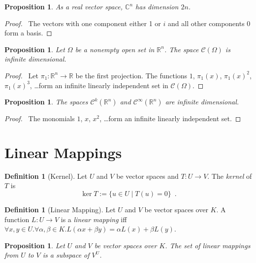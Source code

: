\documentclass{book}
\let\qed\relax
\newtheorem{prop}[ax]{Proposition}
\theoremstyle{definition}
\newtheorem{df}[ax]{Definition}
\begin{document}
\begin{prop}
As a real vector space, $\mathbb{C}^n$ has dimension $2n$.
\end{prop}

\begin{proof}
\pf\ The vectors with one component either 1 or $i$ and all other components 0 form a basis. \qed
\end{proof}

\begin{prop}
Let $\Omega$ be a nonempty open set in $\mathbb{R}^n$. The space $\mathcal{C}(\Omega)$ is infinite dimensional.
\end{prop}

\begin{proof}
\pf\ Let $\pi_1 : \mathbb{R}^n \rightarrow \mathbb{R}$ be the first projection. The functions $1$, $\pi_1(x)$, $\pi_1(x)^2$, $\pi_1(x)^3$, \ldots form an infinite linearly independent set in $\mathcal{C}(\Omega)$. \qed
\end{proof}

\begin{prop}
The spaces $\mathcal{C}^k(\mathbb{R}^n)$ and $\mathcal{C}^\infty(\mathbb{R}^n)$ are infinite dimensional.
\end{prop}

\begin{proof}
\pf\ The monomials $1$, $x$, $x^2$, \ldots form an infinite linearly independent set. \qed
\end{proof}

\section{Linear Mappings}

\begin{df}[Kernel]
Let $U$ and $V$ be vector spaces and $T : U \rightarrow V$. The \emph{kernel} of $T$ is
\[ \ker T := \{ u \in U \mid T(u) = 0 \} \enspace . \]
\end{df}

\begin{df}[Linear Mapping]
Let $U$ and $V$ be vector spaces over $K$. A function $L : U \rightarrow V$ is a \emph{linear mapping} iff $\forall x,y \in U. \forall \alpha, \beta \in K. L(\alpha x + \beta y) = \alpha L(x) + \beta L(y)$.
\end{df}

\begin{prop}
Let $U$ and $V$ be vector spaces over $K$. The set of linear mappings from $U$ to $V$ is a subspace of $V^U$.
\end{prop}
\end{document}
